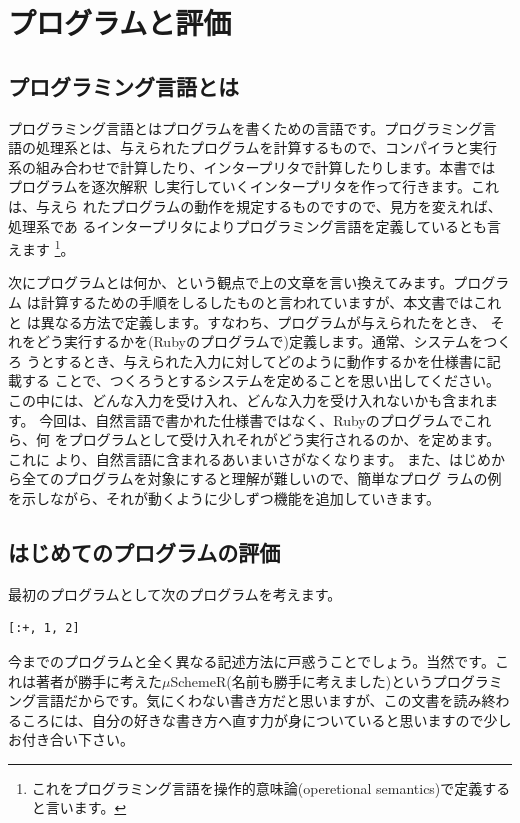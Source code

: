 \chapter{プログラムと評価\hspace{-3mm}}

\section{プログラミング言語とは}

プログラミング言語とはプログラムを書くための言語です。プログラミング言
語の処理系とは、与えられたプログラムを計算するもので、コンパイラと実行
系の組み合わせで計算したり、インタープリタで計算したりします。本書では
プログラムを逐次解釈
し実行していくインタープリタを作って行きます。これは、与えら
れたプログラムの動作を規定するものですので、見方を変えれば、処理系であ
るインタープリタによりプログラミング言語を定義しているとも言えます
\footnote{これをプログラミング言語を操作的意味論(operetional semantics)で定義すると言います。}。

次にプログラムとは何か、という観点で上の文章を言い換えてみます。プログラム
は計算するための手順をしるしたものと言われていますが、本文書ではこれと
は異なる方法で定義します。すなわち、プログラムが与えられたをとき、
それをどう実行するかを(Rubyのプログラムで)定義します。通常、システムをつくろ
うとするとき、与えられた入力に対してどのように動作するかを仕様書に記載する
ことで、つくろうとするシステムを定めることを思い出してください。
この中には、どんな入力を受け入れ、どんな入力を受け入れないかも含まれます。
今回は、自然言語で書かれた仕様書ではなく、Rubyのプログラムでこれら、何
をプログラムとして受け入れそれがどう実行されるのか、を定めます。これに
より、自然言語に含まれるあいまいさがなくなります。
また、はじめから全てのプログラムを対象にすると理解が難しいので、簡単なプログ
ラムの例を示しながら、それが動くように少しずつ機能を追加していきます。

\section{はじめてのプログラムの評価}

最初のプログラムとして次のプログラムを考えます。

\begin{lstlisting}
[:+, 1, 2]
\end{lstlisting}

今までのプログラムと全く異なる記述方法に戸惑うことでしょう。当然です。これは著者が勝手に考えた$\mu$SchemeR(名前も勝手に考えました)というプログラミング言語だからです。気にくわない書き方だと思いますが、この文書を読み終わるころには、自分の好きな書き方へ直す力が身についていると思いますので少しお付き合い下さい。

